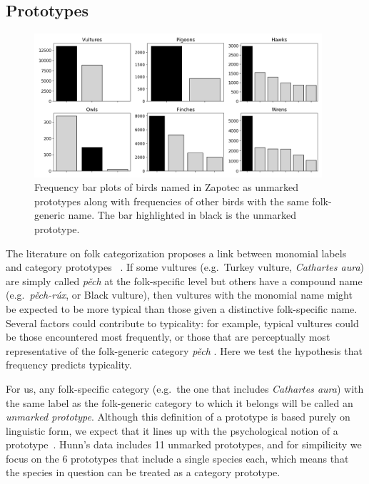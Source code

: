 \documentclass[10pt,letterpaper]{article}
\begin{document}
\subsection{Prototypes}

\begin{figure}[ht!]
  \begin{center}
    \includegraphics[width=0.95\textwidth]{./figures/prototypes-barplots-all.png}
    \vspace{-0.05in}
        \caption{Frequency bar plots of birds named in Zapotec as unmarked prototypes along with frequencies of other birds with the same folk-generic name. The bar highlighted in black is the unmarked prototype.}
        \label{fig-freq-prototype-all}
  \end{center}
\end{figure}

The literature on folk categorization proposes a link between monomial labels and category prototypes
~\cite{berlin1972speculations,berlin2014ethnobiological}. If some vultures (e.g.\ Turkey vulture, \emph{ Cathartes aura}) are simply called \textit{p\v{e}ch} at the folk-specific level but others have a compound name (e.g.\ \textit{p\v{e}ch-r\'{u}x}, or Black vulture), then vultures with the monomial name might be expected to be more typical than those given a distinctive folk-specific name. Several factors could contribute to typicality: for example, typical vultures could be those encountered most frequently, or those that are perceptually most representative of the folk-generic category 
\textit{p\v{e}ch} \cite{berlin2014ethnobiological}.  Here we test the hypothesis that frequency predicts typicality.

For us, any folk-specific category (e.g.\ the one that includes \emph{ Cathartes aura}) with the same label as the folk-generic category to which it belongs will be called an \emph{unmarked prototype}.  Although this definition of a prototype is based purely on linguistic form, we expect that it lines up with the psychological notion of a prototype~\cite{rosch73}. Hunn's data includes 11 unmarked prototypes, and for simpilicity we focus on the 6 prototypes that include a single species each, which means that the species in question can be treated as a category prototype.
\end{document}
